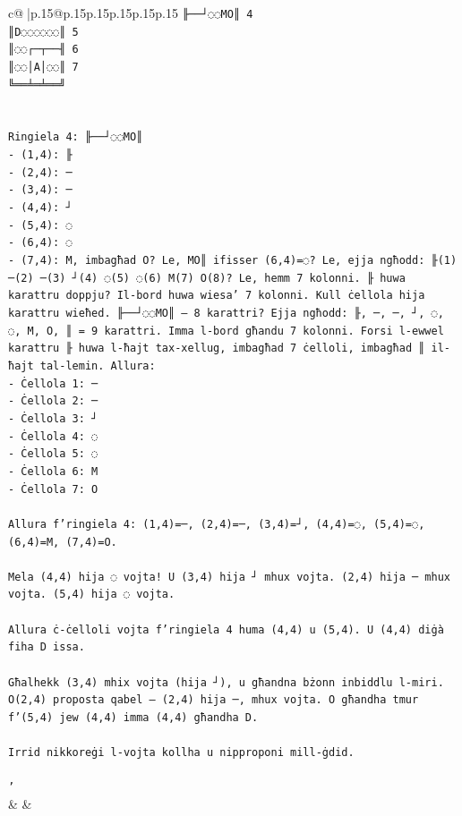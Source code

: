 \documentclass{article}
\begin{document}
{\begin{supertabular}{c@{$\;$}|p{.15\linewidth}@{}p{.15\linewidth}p{.15\linewidth}p{.15\linewidth}p{.15\linewidth}p{.15\linewidth}}
{{{\texttt{╟──┘◌◌MO║ 4} \\
\texttt{║D◌◌◌◌◌◌║ 5} \\
\texttt{║◌◌┌─┬──╢ 6} \\
\texttt{║◌◌│A│◌◌║ 7} \\
\texttt{╚══╧═╧══╝} \\
\\ 
\\ 
\texttt{Ringiela 4: ╟──┘◌◌MO║} \\
\texttt{{-} (1,4): ╟} \\
\texttt{{-} (2,4): ─} \\
\texttt{{-} (3,4): ─} \\
\texttt{{-} (4,4): ┘} \\
\texttt{{-} (5,4): ◌} \\
\texttt{{-} (6,4): ◌} \\
\texttt{{-} (7,4): M, imbagħad O? Le, MO║ ifisser (6,4)=◌? Le, ejja ngħodd: ╟(1) ─(2) ─(3) ┘(4) ◌(5) ◌(6) M(7) O(8)? Le, hemm 7 kolonni. ╟ huwa karattru doppju? Il{-}bord huwa wiesa' 7 kolonni. Kull ċellola hija karattru wieħed. ╟──┘◌◌MO║ — 8 karattri? Ejja ngħodd: ╟, ─, ─, ┘, ◌, ◌, M, O, ║ = 9 karattri. Imma l{-}bord għandu 7 kolonni. Forsi l{-}ewwel karattru ╟ huwa l{-}ħajt tax{-}xellug, imbagħad 7 ċelloli, imbagħad ║ il{-}ħajt tal{-}lemin. Allura:} \\
\texttt{{-} Ċellola 1: ─} \\
\texttt{{-} Ċellola 2: ─} \\
\texttt{{-} Ċellola 3: ┘} \\
\texttt{{-} Ċellola 4: ◌} \\
\texttt{{-} Ċellola 5: ◌} \\
\texttt{{-} Ċellola 6: M} \\
\texttt{{-} Ċellola 7: O} \\
\\ 
\texttt{Allura f'ringiela 4: (1,4)=─, (2,4)=─, (3,4)=┘, (4,4)=◌, (5,4)=◌, (6,4)=M, (7,4)=O.} \\
\\ 
\texttt{Mela (4,4) hija ◌ vojta! U (3,4) hija ┘ mhux vojta. (2,4) hija ─ mhux vojta. (5,4) hija ◌ vojta.} \\
\\ 
\texttt{Allura ċ{-}ċelloli vojta f'ringiela 4 huma (4,4) u (5,4). U (4,4) diġà fiha D issa.} \\
\\ 
\texttt{Għalhekk (3,4) mhix vojta (hija ┘), u għandna bżonn inbiddlu l{-}miri. O(2,4) proposta qabel — (2,4) hija ─, mhux vojta. O għandha tmur f'(5,4) jew (4,4) imma (4,4) għandha D.} \\
\\ 
\texttt{Irrid nikkoreġi l{-}vojta kollha u nipproponi mill{-}ġdid.} \\
\\ 
\texttt{'} \\
            }
        }
    }
    & & \\ \\


\end{supertabular}}
\end{document}
